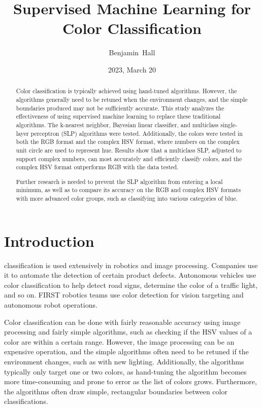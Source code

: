 \documentclass[twoside]{IEEEtran}
\title{Supervised Machine Learning for \\ Color Classification}
\author{Benjamin~Hall}
\date{2023, March 20}
\begin{document}
\maketitle

\begin{abstract}
    Color classification is typically achieved using hand-tuned algorithms. However, the algorithms generally need to be
    retuned when the environment changes, and the simple boundaries produced may not be sufficiently accurate. This study
    analyzes the effectiveness of using supervised machine learning to replace these traditional algorithms. The k-nearest
    neighbor, Bayesian linear classifier, and multiclass single-layer perceptron (SLP) algorithms were tested. Additionally,
    the colors were tested in both the RGB format and the complex HSV format, where numbers on the complex unit circle are
    used to represent hue. Results show that a multiclass SLP, adjusted to support complex numbers, can most accurately and
    efficiently classify colors, and the complex HSV format outperforms RGB with the data tested.

    Further research is needed to prevent the SLP algorithm from entering a local minimum, as well as to compare its
    accuracy on the RGB and complex HSV formats with more advanced color groups, such as classifying into various
    categories of blue.
\end{abstract}

\section{Introduction}

 classification is used extensively in robotics and image processing. Companies use it to
automate the detection of certain product defects. Autonomous vehicles use color classification
to help detect road signs, determine the color of a traffic light, and so on. FIRST robotics teams
use color detection for vision targeting and autonomous robot operations.

Color classification can be done with fairly reasonable accuracy using image processing and
fairly simple algorithms, such as checking if the HSV values of a color are within a certain
range. However, the image processing can be an expensive operation, and the simple algorithms
often need to be retuned if the environment changes, such as with new lighting. Additionally, the
algorithms typically only target one or two colors, as hand-tuning the algorithm becomes more
time-consuming and prone to error as the list of colors grows. Furthermore, the algorithms often
draw simple, rectangular boundaries between color classifications.
\end{document}

